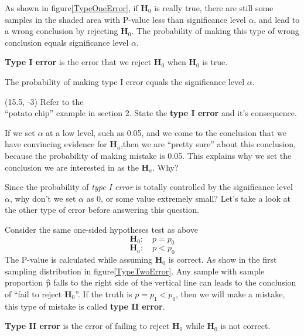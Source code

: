 \documentclass[a4paper, 12pt,twoside]{book}
\newcommand\reallywidehat[1]{%
\savestack{\tmpbox}{\stretchto{%
  \scaleto{%
    \scalerel*[\widthof{\ensuremath{#1}}]{\kern-.6pt\bigwedge\kern-.6pt}%
    {\rule[-\textheight/2]{1ex}{\textheight}}%
  }{\textheight}%
}{0.5ex}}%
\stackon[1pt]{#1}{\tmpbox}%
}
\begin{document}
As shown in figure\ref{TypeOneError}, if $\textbf{H}_0$ is really true,  there are still some samples in the shaded area with P-value less than significance level $\alpha$, and lead to a wrong conclusion by rejecting $\textbf{H}_0$. The probability of making this type of wrong conclusion equals significance level $\alpha$. \vspace{0.3cm}


\colorbox{babypink}{\parbox{\textwidth}{
\textbf{Type I error} is the error that we reject $\textbf{H}_0$ when  $\textbf{H}_0$ is true.\vspace{0.3cm}

The probability of making type I error equals the significance level $\alpha$.
}}

\begin{textblock}{3}(15.5, -3)
Refer to the \\``potato chip'' example in section 2. State the   \textbf{type I error} and it's consequence.
\end{textblock}
\vspace{0.3cm}

 If we set $\alpha$ at a low level, such as 0.05, and we come to the conclusion that we have convincing evidence for $\textbf{H}_a$,then we are ``pretty sure'' about this conclusion, because the probability of making mistake is 0.05. This explains why we set the conclusion we are interested in as the $\textbf{H}_a$. Why?\vspace{0.3cm}

Since the probability of \textit{type I error} is totally controlled by the significance level $\alpha$, why don't we set $\alpha$ as 0, or some value extremely small? Let's take a look at the other type of error before answering this question.\vspace{0.3cm}

Consider the same one-sided hypotheses test as above
$$\textbf{H}_0: \quad p=p_0$$
$$\textbf{H}_a: \quad p<p_0$$
The P-value is calculated while assuming $\textbf{H}_0$ is correct. As show in the first sampling distribution in figure\ref{TypeTwoError}. Any sample with sample proportion $\reallywidehat{p}$ falls to the right side of the vertical line can leads to the conclusion of ``fail to reject $\textbf{H}_0$''. If the truth is $p=p_1<p_0$, then we will make a mistake, this type of mistake is called \textbf{type II error}.\vspace{0.3cm}


\colorbox{babypink}{\parbox{\textwidth}{
\textbf{Type II error} is the error of failing to reject $\textbf{H}_0$ while $\textbf{H}_0$ is not correct.
}}
\end{document}
